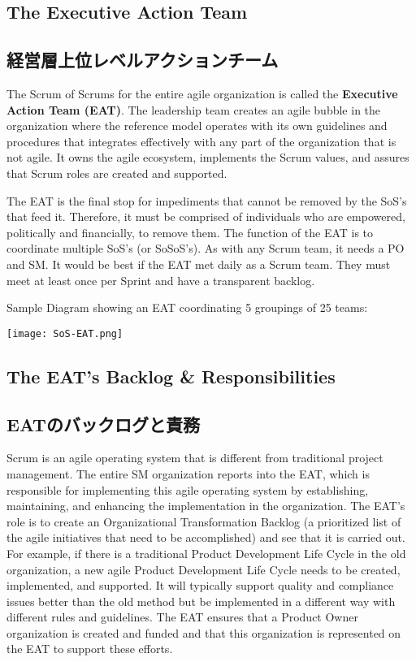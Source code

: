 \documentclass[12pt,a4paper,parskip=full]{scrartcl}
\begin{document}
\subsection{The Executive Action Team}
\fi
\subsection{経営層上位レベルアクションチーム}
The Scrum of Scrums for the entire agile organization is called the
\textbf{Executive Action Team (EAT)}. The leadership team creates an agile bubble
in the organization where the reference model operates with 
its own guidelines and procedures that integrates effectively 
with any part of the organization that is not agile. It owns the agile ecosystem, 
implements the Scrum values, and assures that 
Scrum roles are created and supported.

The EAT is the final stop for
impediments that cannot be removed by the SoS's that feed it. Therefore, it
must be comprised of individuals who are empowered, politically and
financially, to remove them. 
The function of the EAT is to coordinate
multiple SoS's (or SoSoS's). As with any Scrum team, it needs a PO and SM.
It would be best if the EAT met daily as a Scrum team. They must meet at
least once per Sprint and have a transparent backlog.

Sample Diagram showing an EAT coordinating 5 groupings of 25 teams:

\texttt{[image: SoS-EAT.png]}

\subsection{The EAT's Backlog \& Responsibilities}
\fi
\subsection{EATのバックログと責務}
Scrum is an agile operating system that is different from traditional
project management. The entire SM organization reports into the EAT, which
is responsible for implementing this agile operating system by
establishing, maintaining, and enhancing the implementation in the
organization.
The EAT's role is to create an Organizational Transformation Backlog (a
prioritized list of the agile initiatives that need to be accomplished) and
see that it is carried out. For example, if there is a traditional Product
Development Life Cycle in the old organization, a new agile Product
Development Life Cycle needs to be created, implemented, and supported. It
will typically support quality and compliance issues better than the old
method but be implemented in a different way with different rules and
guidelines. The EAT ensures that a Product Owner organization is created and funded
and that this organization is represented on the EAT to support these efforts.
\end{document}
